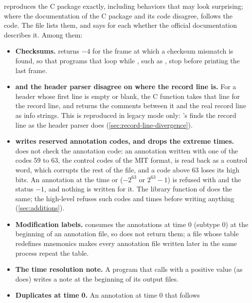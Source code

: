\wfdbx{} reproduces the C package exactly, including behaviors that may look
surprising; where the documentation of the C package and its code disagree,
\wfdbx{} follows the code. The file  lists
them, and says for each whether the official documentation describes it.
Among them:
\begin{itemize}
\item \textbf{Checksums.}  returns $-4$ for the frame at which a
  checksum mismatch is found, so that programs that loop while
  , such as , stop before printing the
  last frame.
\item \textbf{ and the header parser disagree on where the
  record line is.} For a header whose first line is empty or blank, the C
  function  takes that line for the record line, and returns
  the comments between it and the real record line as info strings. This
  is reproduced in legacy mode only: \wfdbx{}'s  finds the
  record line as the header parser does (\cref{sec:record-line-divergence}).
\item \textbf{ writes reserved annotation codes, and drops
  the extreme times.}  does not check the annotation code: an
  annotation written with one of the codes 59 to 63, the control codes of
  the MIT format, is read back as a control word, which corrupts the rest of
  the file, and a code above 63 loses its high bits. An annotation at the
  time  or  ($-2^{63}$ or
  $2^{63}-1$) is refused with  and the status $-1$, and nothing is written for it. The library
  function  of \wfdbx{} does the same; the high-level
   refuses such codes and times before writing
  anything (\cref{sec:additions}).
\item \textbf{Modification labels.}  consumes the 
  annotations at time 0 (subtype 0) at the beginning of an annotation file,
  so  does not return them; a file whose table redefines
  mnemonics makes every annotation file written later in the same process
  repeat the table.
\item \textbf{The time resolution note.} A program that calls
   with a positive value (as  does) writes a
   note at the beginning of its output files.
\item \textbf{Duplicates at time 0.} An annotation at time 0 that follows

\end{itemize}
